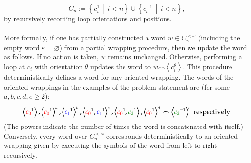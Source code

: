 \documentclass[11pt, a4paper, oneside]{article}
\theoremstyle{remark}
\theoremstyle{lemma}
\begin{document}
\[
C_n := \left\{c_i^{1} \,\middle|\, i < n\right\} \cup \left\{c_i^{-1} \,\middle|\, i < n\right\},
\] 
by recursively recording loop orientations and positions.
\\\\
More formally, if one has partially constructed a word \( w \in C_n^{<\omega} \) (including the empty word \( \varepsilon=\varnothing\)) from a partial wrapping procedure, then we update the word as follows. If no action is taken, \( w \) remains unchanged. Otherwise, performing a loop at \( c_i \) with orientation \( \theta \) updates the word to \( w \frown \left\langle c_i^\theta \right\rangle \). This procedure deterministically defines a word for any oriented wrapping. The words of the oriented wrappings in the examples of the problem statement are (for some \( a,b,c,d,e \geq 2 \)):
\[
\left\langle \textcolor{red}{c_0}^{1}\right\rangle, \left\langle \textcolor{red}{c_0}^{1}\right\rangle^{a}, \left\langle \textcolor{blue}{c_1}^{1}\right\rangle^{b}, \left\langle \textcolor{red}{c_0}^{1}, \textcolor{blue}{c_1}^{1}\right\rangle^{c}, \left\langle \textcolor{red}{c_0}^{1}, \textcolor{green!50!black}{c_2}^{1}\right\rangle, \left\langle \textcolor{red}{c_0}^{1}\right\rangle^{d} \frown \left\langle \textcolor{green!50!black}{c_2}^{-1}\right\rangle^{e} \text{ respectively.}
\]
(The powers indicate the number of times the word is concatenated with itself.) Conversely, every word over \(C_n^{<\omega}\) corresponds deterministically to an oriented wrapping given by executing the symbols of the word from left to right recursively.
\end{document}
